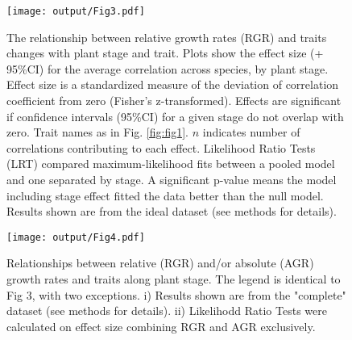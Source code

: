 \documentclass[a4paper,11pt]{article}
\begin{document}
\begin{figure}[h!]
\centering
\texttt{[image: output/Fig3.pdf]}
\caption{The relationship between relative growth rates (RGR) and traits changes with plant stage and trait. Plots show the effect size (+ 95\%CI) for the average correlation across species, by plant stage. Effect size is a standardized measure of the deviation of correlation coefficient from zero (Fisher's z-transformed). Effects are significant if confidence intervals (95\%CI) for a given stage do not overlap with zero. Trait names as in Fig. \ref{fig:fig1}. $n$ indicates number of correlations contributing to each effect. Likelihood Ratio Tests (LRT) compared maximum-likelihood fits between a pooled model and one separated by stage. A significant p-value means the model including stage effect fitted the data better than the null model. Results shown are from the ideal dataset (see methods for details).}
\label{fig:fig3}
\end{figure}

\begin{figure}[h!]
\centering
\texttt{[image: output/Fig4.pdf]}
\caption{Relationships between relative (RGR) and/or absolute (AGR) growth rates and traits along plant stage. The legend is identical to Fig 3, with two exceptions. i) Results shown are from the "complete" dataset (see methods for details). ii) Likelihodd Ratio Tests were calculated on effect size combining RGR and AGR exclusively.}
\label{fig:fig4}
\end{figure}




\clearpage
\end{document}
